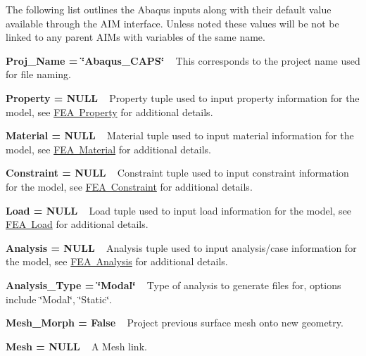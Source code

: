 The following list outlines the Abaqus inputs along with their default value available through the AIM interface. Unless noted these values will be not be linked to any parent AIMs with variables of the same name.


\begin{DoxyItemize}
\item {\bfseries{ Proj\+\_\+\+Name = \char`\"{}\+Abaqus\+\_\+\+CAPS\char`\"{}}} ~\newline
 This corresponds to the project name used for file naming.
\item {\bfseries{ Property = NULL}} ~\newline
 Property tuple used to input property information for the model, see \mbox{\hyperlink{feaProperty}{FEA Property}} for additional details.
\item {\bfseries{ Material = NULL}} ~\newline
 Material tuple used to input material information for the model, see \mbox{\hyperlink{feaMaterial}{FEA Material}} for additional details.
\item {\bfseries{ Constraint = NULL}} ~\newline
 Constraint tuple used to input constraint information for the model, see \mbox{\hyperlink{feaConstraint}{FEA Constraint}} for additional details.
\item {\bfseries{ Load = NULL}} ~\newline
 Load tuple used to input load information for the model, see \mbox{\hyperlink{feaLoad}{FEA Load}} for additional details.
\item {\bfseries{ Analysis = NULL}} ~\newline
 Analysis tuple used to input analysis/case information for the model, see \mbox{\hyperlink{feaAnalysis}{FEA Analysis}} for additional details.
\item {\bfseries{ Analysis\+\_\+\+Type = \char`\"{}\+Modal\char`\"{}}} ~\newline
 Type of analysis to generate files for, options include \char`\"{}\+Modal\char`\"{}, \char`\"{}\+Static\char`\"{}.
\item {\bfseries{ Mesh\+\_\+\+Morph = False}} ~\newline
 Project previous surface mesh onto new geometry.
\item {\bfseries{Mesh = NULL}} ~\newline
 A Mesh link. 
\end{DoxyItemize}